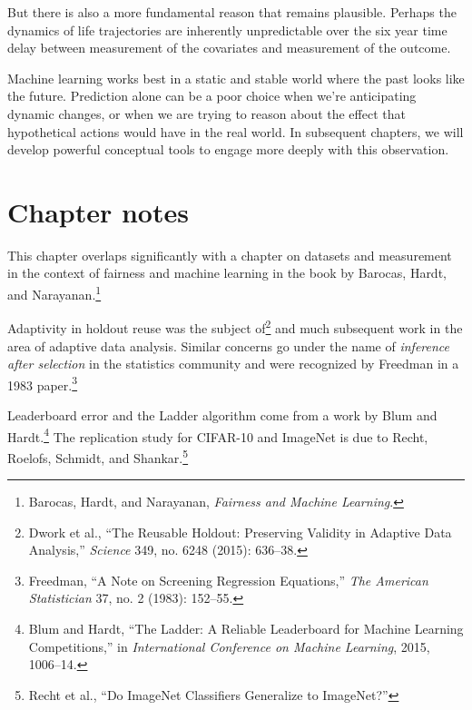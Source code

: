 \documentclass{tufte-book}
\begin{document}
But there is also a more fundamental reason that remains plausible.
Perhaps the dynamics of life trajectories are inherently unpredictable
over the six year time delay between measurement of the covariates and
measurement of the outcome.

Machine learning works best in a static and stable world where the past
looks like the future. Prediction alone can be a poor choice when we're
anticipating dynamic changes, or when we are trying to reason about the
effect that hypothetical actions would have in the real world. In
subsequent chapters, we will develop powerful conceptual tools to engage
more deeply with this observation.

\hypertarget{chapter-notes-7}{%
\section{Chapter notes}\label{chapter-notes-7}}

This chapter overlaps significantly with a chapter on datasets and
measurement in the context of fairness and machine learning in the book
by Barocas, Hardt, and Narayanan.\footnote{Barocas, Hardt, and
  Narayanan, \emph{Fairness and Machine Learning}.}

Adaptivity in holdout reuse was the subject of\footnote{Dwork et al.,
  {``The Reusable Holdout: Preserving Validity in Adaptive Data
  Analysis,''} \emph{Science} 349, no. 6248 (2015): 636--38.} and much
subsequent work in the area of adaptive data analysis. Similar concerns
go under the name of \emph{inference after selection} in the statistics
community and were recognized by Freedman in a 1983 paper.\footnote{Freedman,
  {``A Note on Screening Regression Equations,''} \emph{The American
  Statistician} 37, no. 2 (1983): 152--55.}

Leaderboard error and the Ladder algorithm come from a work by Blum and
Hardt.\footnote{Blum and Hardt, {``The Ladder: A Reliable Leaderboard
  for Machine Learning Competitions,''} in \emph{International
  Conference on Machine Learning}, 2015, 1006--14.} The replication
study for CIFAR-10 and ImageNet is due to Recht, Roelofs, Schmidt, and
Shankar.\footnote{Recht et al., {``Do ImageNet Classifiers Generalize to
  ImageNet?''}}
\end{document}

